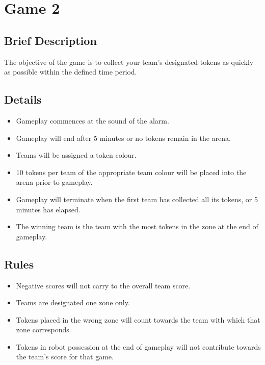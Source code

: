 \section {Game 2}

\subsection {Brief Description}

The objective of the game is to collect your team's designated tokens as quickly as possible within the defined time period.

\subsection {Details}

\begin {itemize}
\item {Gameplay commences at the sound of the alarm.}
\item {Gameplay will end after 5 minutes or no tokens remain in the arena.}
\item {Teams will be assigned a token colour.}
\item {10 tokens per team of the appropriate team colour will be placed into the arena prior to gameplay.}
\item {Gameplay will terminate when the first team has collected all its tokens, or 5 minutes has elapsed.}
\item {The winning team is the team with the most tokens in the zone at the end of gameplay.}

\end {itemize}

\subsection {Rules}

\begin {itemize}
\item {Negative scores will not carry to the overall team score.}
\item Teams are designated one zone only.
\item Tokens placed in the wrong zone will count towards the team with which that zone corresponds.
\item Tokens in robot possession at the end of gameplay will not contribute towards the team's score for that game.
\end {itemize}

